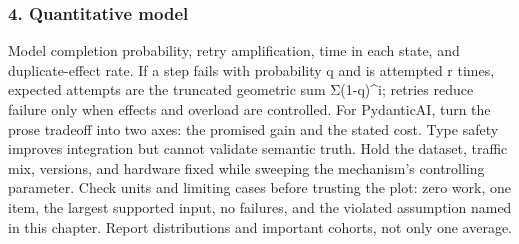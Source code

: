 \subsubsection*{4. Quantitative model}
Model completion probability, retry amplification, time in each state, and duplicate-effect rate. If a step fails with probability q and is attempted r times, expected attempts are the truncated geometric sum Σ(1-q)\textasciicircum{}i; retries reduce failure only when effects and overload are controlled.
For PydanticAI, turn the prose tradeoff into two axes: the promised gain and the stated cost. Type safety improves integration but cannot validate semantic truth. Hold the dataset, traffic mix, versions, and hardware fixed while sweeping the mechanism's controlling parameter.
Check units and limiting cases before trusting the plot: zero work, one item, the largest supported input, no failures, and the violated assumption named in this chapter. Report distributions and important cohorts, not only one average.
